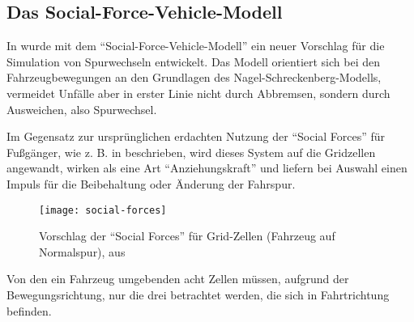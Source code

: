 \subsection{Das Social-Force-Vehicle-Modell}
\label{sec:social-force-vm}

In \cite{dat-ba} wurde mit dem \enquote{Social-Force-Vehicle-Modell} ein neuer Vorschlag für die Simulation von Spurwechseln entwickelt. 
Das Modell orientiert sich bei den Fahrzeugbewegungen an den Grundlagen des Nagel-Schreckenberg-Modells, vermeidet Unfälle aber in erster Linie nicht durch Abbremsen, sondern durch Ausweichen, also Spurwechsel. 

Im Gegensatz zur ursprünglichen erdachten Nutzung der \enquote{Social Forces} für Fußgänger, wie z. B. in \cite{soc-for} beschrieben, wird dieses System auf die Gridzellen angewandt, wirken als eine Art \enquote{Anziehungskraft} und liefern bei Auswahl einen Impuls für die Beibehaltung oder Änderung der Fahrspur. 
\begin{figure}[hptb]
 \centering
 \texttt{[image: social-forces]}
 \caption[\enquote{Social Forces} für Grid-Zellen]{Vorschlag der \enquote{Social Forces} für Grid-Zellen (Fahrzeug auf Normalspur), aus \cite{dat-ba}}
 \label{figure:social-forces}
\end{figure}
\noindent
Von den ein Fahrzeug umgebenden acht Zellen müssen, aufgrund der Bewegungsrichtung, nur die drei betrachtet werden, die sich in Fahrtrichtung befinden.

